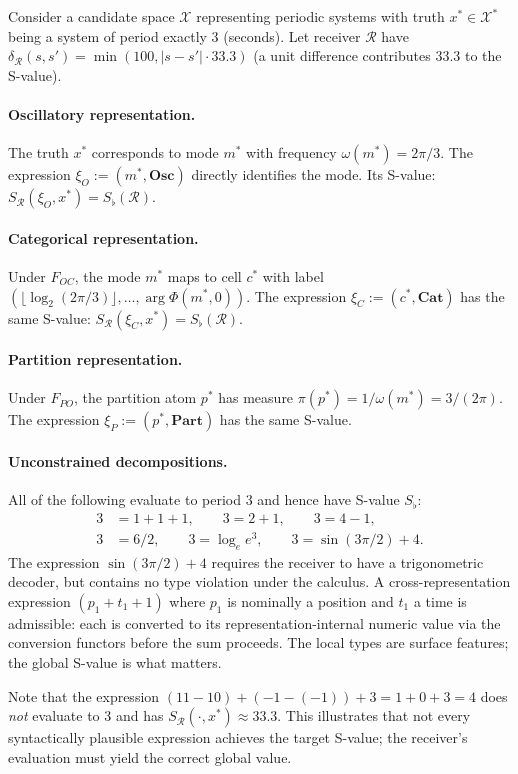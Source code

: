 \begin{example}
\label{ex:period-3}
Consider a candidate space $\mathcal{X}$ representing periodic systems with
truth $x^* \in \mathcal{X}^*$ being a system of period exactly $3$ (seconds).
Let receiver $\mathcal{R}$ have $\delta_{\mathcal{R}}(s, s') =
\min(100, |s - s'| \cdot 33.3)$ (a unit difference contributes $33.3$ to
the S-value).

\paragraph{Oscillatory representation.}
The truth $x^*$ corresponds to mode $m^*$ with frequency $\omega(m^*) =
2\pi/3$.  The expression $\xi_O := (m^*, \mathbf{Osc})$ directly identifies
the mode.  Its S-value: $S_{\mathcal{R}}(\xi_O, x^*) = S_\flat(\mathcal{R})$.

\paragraph{Categorical representation.}
Under $F_{OC}$, the mode $m^*$ maps to cell $c^*$ with label
$(\lfloor \log_2(2\pi/3) \rfloor, \ldots, \arg \Phi(m^*, 0))$.
The expression $\xi_C := (c^*, \mathbf{Cat})$ has the same S-value:
$S_{\mathcal{R}}(\xi_C, x^*) = S_\flat(\mathcal{R})$.

\paragraph{Partition representation.}
Under $F_{PO}$, the partition atom $p^*$ has measure
$\pi(p^*) = 1/\omega(m^*) = 3/(2\pi)$.
The expression $\xi_P := (p^*, \mathbf{Part})$ has the same S-value.

\paragraph{Unconstrained decompositions.}
All of the following evaluate to period $3$ and hence have S-value $S_\flat$:
\begin{align*}
  3 &= 1 + 1 + 1, \qquad 3 = 2 + 1, \qquad 3 = 4 - 1, \\
  3 &= 6/2, \qquad 3 = \log_e e^3, \qquad
  3 = \sin(3\pi/2) + 4 .
\end{align*}
The expression $\sin(3\pi/2) + 4$ requires the receiver to have a
trigonometric decoder, but contains no type violation under the calculus.
A cross-representation expression $(p_1 + t_1 + 1)$ where $p_1$ is
nominally a position and $t_1$ a time is admissible: each is converted to
its representation-internal numeric value via the conversion functors before
the sum proceeds.  The local types are surface features; the global S-value
is what matters.

Note that the expression $(11 - 10) + (-1 - (-1)) + 3 = 1 + 0 + 3 = 4$
does \emph{not} evaluate to $3$ and has $S_{\mathcal{R}}(\cdot, x^*)
\approx 33.3$.  This illustrates that not every syntactically plausible
expression achieves the target S-value; the receiver's evaluation must yield
the correct global value.
\end{example}

